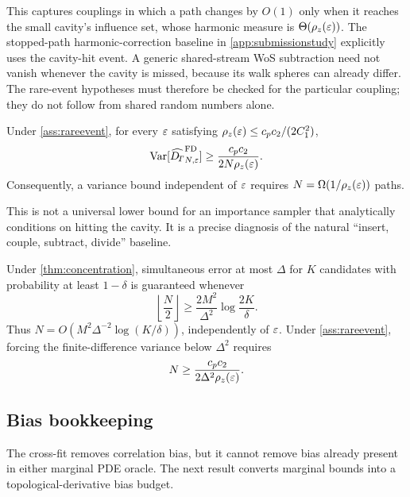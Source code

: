 This captures couplings in which a path changes by $O(1)$ only when it reaches
the small cavity's influence set, whose harmonic measure is
$\Theta(\rho_z(\varepsilon))$. The stopped-path harmonic-correction
baseline in \cref{app:submissionstudy} explicitly uses the cavity-hit event.
A generic shared-stream WoS subtraction need not vanish whenever the cavity
is missed, because its walk spheres can already differ. The rare-event
hypotheses must therefore be checked for the particular coupling; they do
not follow from shared random numbers alone.

\begin{theorem}
\label{thm:rarevariance}
Under \cref{ass:rareevent}, for every
$\varepsilon$ satisfying
$\rho_z(\varepsilon)\le c_pc_2/(2C_1^2)$,
\begin{equation}
 \operatorname{Var}[\widehat{D_{\!T}}^{\mathrm{FD}}_{N,\varepsilon}]
 \ge \frac{c_pc_2}{2N\rho_z(\varepsilon)}.
 \label{eq:rarevariance}
\end{equation}
Consequently, a variance bound independent of $\varepsilon$ requires
$N=\Omega(1/\rho_z(\varepsilon))$ paths.
\end{theorem}

This is not a universal lower bound for an importance sampler that analytically
conditions on hitting the cavity.  It is a precise diagnosis of the natural
``insert, couple, subtract, divide'' baseline.

\begin{corollary}
\label{cor:ranking}
Under \cref{thm:concentration}, simultaneous error at most $\Delta$ for $K$
candidates with probability at least $1-\delta$ is guaranteed whenever
\begin{equation}
 \left\lfloor\frac N2\right\rfloor
 \ge\frac{2M^2}{\Delta^2}\log\frac{2K}{\delta}.
 \label{eq:directcomplexity}
\end{equation}
Thus $N=O(M^2\Delta^{-2}\log(K/\delta))$, independently of $\varepsilon$.
Under \cref{ass:rareevent}, forcing the finite-difference variance below
$\Delta^2$ requires
\begin{equation}
 N\ge\frac{c_pc_2}{2\Delta^2\rho_z(\varepsilon)}.
 \label{eq:fdcomplexity}
\end{equation}
\end{corollary}

\subsection{Bias bookkeeping}

The cross-fit removes correlation bias, but it cannot remove bias already
present in either marginal PDE oracle.  The next result converts marginal
bounds into a topological-derivative bias budget.

